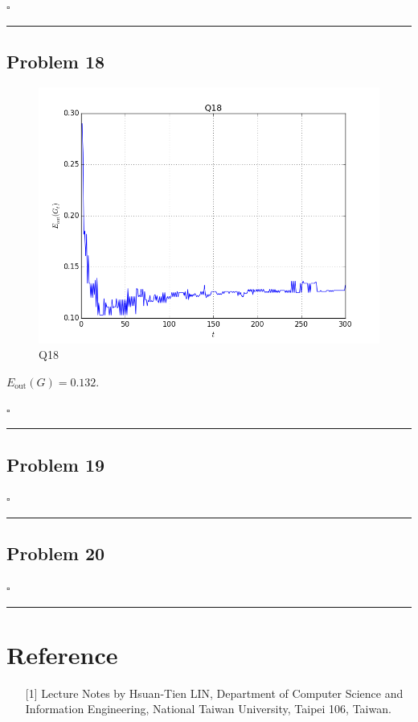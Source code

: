 \documentclass[12pt]{article}
\newcommand*{\QEDB}{\hfill\ensuremath{\square}}
\newcommand{\ParTh}[1]{\left(#1\right)}
\newcommand{\horrule}[1]{\rule{\linewidth}{#1}}
\begin{document}
\QEDB

\horrule{0.5pt}

\subsection*{Problem 18}

\begin{figure}[H]
	\centering
	\includegraphics[scale=0.5]{Q18.png}
	\caption{Q18}
	\label{Q18}
\end{figure}
$E_{\text{out}}\ParTh{G}=0.132$.

\QEDB

\horrule{0.5pt}

\subsection*{Problem 19}



\QEDB

\horrule{0.5pt}

\subsection*{Problem 20}

\QEDB

\horrule{0.5pt}

\section*{Reference}

\begin{enumerate}

\item[{[1]}] Lecture Notes by Hsuan-Tien LIN, Department of Computer Science and Information Engineering, National Taiwan University, Taipei 106, Taiwan.

\end{enumerate}
\end{document}
